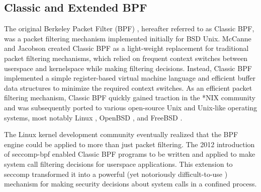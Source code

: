 \subsection{Classic and Extended BPF}

The original Berkeley Packet Filter (BPF) \cite{mccanne1993_bpf}, hereafter referred to as Classic BPF, was a packet filtering mechanism implemented initially for BSD Unix. McCanne and Jacobson created Classic BPF as a light-weight replacement for traditional packet filtering mechanisms, which relied on frequent context switches between userspace and kernelspace while making filtering decisions. Instead, Classic BPF implemented a simple register-based virtual machine language and efficient buffer data structures to minimize the required context switches. As an efficient packet filtering mechanism, Classic BPF quickly gained traction in the *NIX community and was subsequently ported to various open-source Unix and Unix-like operating systems, most notably Linux \cite{linux_bpf}, OpenBSD \cite{openbsd_bpf}, and FreeBSD \cite{freebsd_bpf}.

The Linux kernel development community eventually realized that the BPF engine could be applied to more than just packet filtering. The 2012 introduction of seccomp-bpf \cite{drewry2012_seccomp_bpf,seccomp_bpf} enabled Classic BPF programs to be written and applied to make system call filtering decisions for userspace applications. This extension to seccomp transformed it into a powerful (yet notoriously difficult-to-use \cite{anderson2017_comparison}) mechanism for making security decisions about system calls in a confined process.


